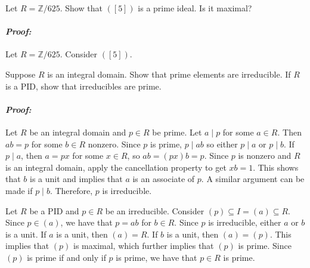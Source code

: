 \documentclass [12pt] {article}
\newcommand{\Z}{\mathbb{Z}}
\renewcommand{\it}[1]{\textit{{#1}}}
\newenvironment{problem}{\begin{tcolorbox}[title=Problem,colback=black!5!white,colframe=black!75!black]}{\end{tcolorbox}}
\newenvironment{response}{\begin{responseframe}\vspace{-10pt}\paragraph{\it{Proof:}}}{\end{responseframe}}
\begin{document}
\begin{problem}
    Let $R=\Z/625$. Show that $([5])$ is a prime ideal. Is it maximal?
\end{problem}
\begin{response}
    Let $R=\Z/625$. Consider $([5])$.
\end{response}
\newpage

\begin{problem}
    Suppose $R$ is an integral domain. Show that prime elements are irreducible.
    If $R$ is a PID, show that irreducibles are prime.
\end{problem}
\begin{response}
    Let $R$ be an integral domain and $p\in R$ be prime. Let $a\mid p$ for some
    $a\in R$. Then $ab=p$ for some $b\in R$ nonzero. Since $p$ is prime,
    $p\mid ab$ so either $p\mid a$ or $p\mid b$. If $p\mid a$, then $a=px$ for
    some $x\in R$, so $ab=(px)b=p$. Since $p$ is nonzero and $R$ is an integral
    domain, apply the cancellation property to get $xb=1$. This shows that $b$
    is a unit and implies that $a$ is an associate of $p$. A similar argument
    can be made if $p\mid b$. Therefore, $p$ is irreducible.
    \vspace{1em}

    Let $R$ be a PID and $p \in R$ be an irreducible. Consider
    $(p)\subseteq I=(a)\subseteq R$. Since $p\in (a)$, we have that $p=ab$ for
    $b\in R$. Since $p$ is irreducible, either $a$ or $b$ is a unit. If $a$ is a
    unit, then $(a)=R$. If $b$ is a unit, then $(a)=(p)$. This implies that
    $(p)$ is maximal, which further implies that $(p)$ is prime. Since $(p)$ is
    prime if and only if $p$ is prime, we have that $p\in R$ is prime.
\end{response}
\end{document}
